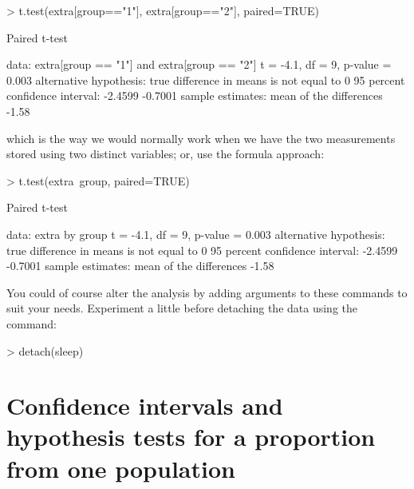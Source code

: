 \begin{Schunk}
\begin{Sinput}
> t.test(extra[group=="1"], extra[group=="2"], paired=TRUE) 
\end{Sinput}
\begin{Soutput}

	Paired t-test

data:  extra[group == "1"] and extra[group == "2"]
t = -4.1, df = 9, p-value = 0.003
alternative hypothesis: true difference in means is not equal to 0
95 percent confidence interval:
 -2.4599 -0.7001
sample estimates:
mean of the differences 
                  -1.58 
\end{Soutput}
\end{Schunk}

 
which is the way we would normally work when we have the two measurements stored using two distinct variables; or, use the formula approach: 

\begin{Schunk}
\begin{Sinput}
> t.test(extra~group, paired=TRUE) 
\end{Sinput}
\begin{Soutput}

	Paired t-test

data:  extra by group
t = -4.1, df = 9, p-value = 0.003
alternative hypothesis: true difference in means is not equal to 0
95 percent confidence interval:
 -2.4599 -0.7001
sample estimates:
mean of the differences 
                  -1.58 
\end{Soutput}
\end{Schunk}

 
You could of course alter the analysis by adding arguments to these commands to suit your needs. Experiment a little before detaching the  data using the  command: 

\begin{Schunk}
\begin{Sinput}
> detach(sleep) 
\end{Sinput}
\end{Schunk}

 
 
\section{Confidence intervals and hypothesis tests for a proportion from one population} 
 
